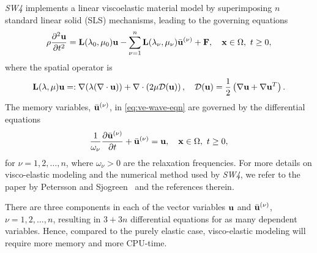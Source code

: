 \documentclass[11pt]{report}
\newcommand{\Fb}{{\bf F}}
\newcommand{\Lb}{{\bf L}}
\newcommand{\ub}{{\bf u}}
\newcommand{\xb}{{\bf x}}
\newcommand{\p}{\partial}
\begin{document}
\emph{SW4} implements a linear viscoelastic material model by superimposing $n$ standard
linear solid (SLS) mechanisms, leading to the governing equations
\begin{equation}\label{eq:ve-wave-eqn}
{\displaystyle \rho\dfrac{\p^2\ub}{\p t^2} = \Lb(\lambda_0,\mu_0)\ub - \sum_{\nu=1}^n
\Lb(\lambda_{\nu},\mu_\nu)\bar{\ub}^{(\nu)} + \Fb,\quad \xb\in\Omega,\ t\geq 0},
\end{equation}
where the spatial operator is
\begin{equation}\label{eq:spatial-op}
\Lb(\lambda,\mu)\ub =: \nabla(\lambda(\nabla\cdot\ub)) + \nabla\cdot \left(2\mu {\cal
  D}(\ub)\right),\quad {\cal D}(\ub) = \frac{1}{2}\left(\nabla \ub + \nabla\ub^T\right).
\end{equation}
The memory variables, $\bar{\ub}^{(\nu)}$, in \eqref{eq:ve-wave-eqn} are governed by the
differential equations
\begin{equation}\label{eq:ve-ode}
\displaystyle \frac{1}{\omega_\nu}\frac{\p \bar{\ub}^{(\nu)}}{\p t} + \bar{\ub}^{(\nu)} = \ub,\quad
\xb\in\Omega,\ t\geq 0,
\end{equation}
for $\nu=1,2,\ldots,n$, where $\omega_\nu>0$ are the relaxation frequencies. For more details on
visco-elastic modeling and the numerical method used by \emph{SW4}, we refer to the paper by
Petersson and Sjogreen~\cite{PetSjo-10b} and the references therein.

There are three components in each of the vector variables $\ub$ and $\bar{\ub}^{(\nu)}$,
$\nu=1,2,\ldots,n$, resulting in $3+3n$ differential equations for as many dependent
variables. Hence, compared to the purely elastic case, visco-elastic modeling will require more
memory and more CPU-time.
\end{document}
